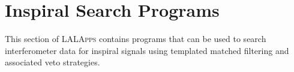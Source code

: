 \chapter{Inspiral Search Programs}
\label{chapter:inspiral}

This section of \textsc{LALApps} contains programs that can be used to search
interferometer data for inspiral signals using templated matched filtering and
associated veto strategies.

\clearpage


\clearpage


\clearpage


\clearpage


\clearpage


\clearpage


\clearpage


\clearpage


\clearpage


%
%
